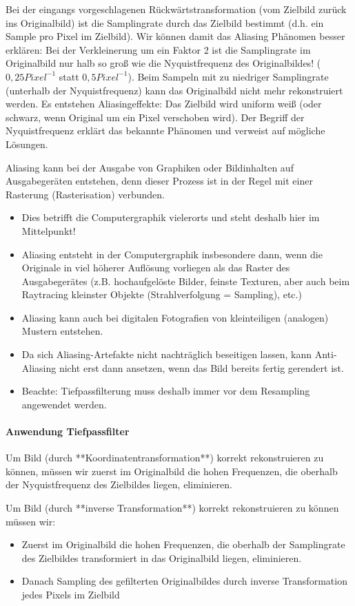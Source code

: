\documentclass[10pt,landscape]{article}
\begin{document}
\begin{multicols}{3}
Bei der eingangs vorgeschlagenen Rückwärtstransformation (vom Zielbild zurück ins Originalbild) ist die Samplingrate durch das Zielbild bestimmt (d.h. ein Sample pro Pixel im Zielbild). 
Wir können damit das Aliasing Phänomen besser erklären: Bei der Verkleinerung um ein Faktor 2 ist die Samplingrate im Originalbild nur halb so groß wie die
Nyquistfrequenz des Originalbildes! ($0,25 Pixel^{-1}$ statt $0,5 Pixel^{-1}$).
Beim Sampeln mit zu niedriger Samplingrate (unterhalb der Nyquistfrequenz) kann das Originalbild nicht mehr rekonstruiert werden. Es entstehen Aliasingeffekte: Das Zielbild wird  uniform weiß (oder schwarz, wenn Original um ein Pixel verschoben wird).
Der Begriff der Nyquistfrequenz erklärt das bekannte Phänomen und verweist auf mögliche Lösungen.

Aliasing kann bei der Ausgabe von Graphiken oder Bildinhalten auf Ausgabegeräten entstehen, denn dieser Prozess ist in der Regel mit einer Rasterung (Rasterisation) verbunden.
\begin{itemize}
  \item Dies betrifft die Computergraphik vielerorts und steht deshalb hier im Mittelpunkt!
  \item Aliasing entsteht in der Computergraphik insbesondere dann, wenn die Originale in viel höherer Auflösung vorliegen als das Raster des Ausgabegerätes (z.B. hochaufgelöste Bilder, feinste Texturen, aber auch beim Raytracing kleinster Objekte (Strahlverfolgung = Sampling), etc.)
  \item Aliasing kann auch bei digitalen Fotografien von kleinteiligen (analogen) Mustern entstehen.
  \item Da sich Aliasing-Artefakte nicht nachträglich beseitigen lassen, kann Anti-Aliasing nicht erst dann ansetzen, wenn das Bild bereits fertig gerendert ist.
  \item Beachte: Tiefpassfilterung muss deshalb immer vor dem Resampling angewendet werden.
\end{itemize}

\paragraph{Anwendung Tiefpassfilter}
Um Bild (durch **Koordinatentransformation**) korrekt rekonstruieren zu können, müssen wir zuerst im Originalbild die hohen Frequenzen, die oberhalb der Nyquistfrequenz des Zielbildes liegen, eliminieren.

Um Bild (durch **inverse Transformation**) korrekt rekonstruieren zu können müssen wir:
\begin{itemize}
  \item Zuerst im Originalbild die hohen Frequenzen, die oberhalb der Samplingrate des Zielbildes transformiert in das Originalbild liegen, eliminieren.
  \item Danach Sampling des gefilterten Originalbildes durch inverse Transformation jedes Pixels im Zielbild
\end{itemize}


\end{multicols}
\end{document}
